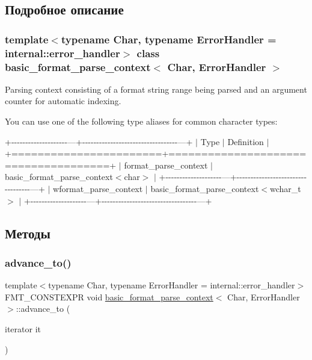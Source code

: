 \subsection{Подробное описание}
\subsubsection*{template$<$typename Char, typename Error\+Handler = internal\+::error\+\_\+handler$>$\newline
class basic\+\_\+format\+\_\+parse\+\_\+context$<$ Char, Error\+Handler $>$}

Parsing context consisting of a format string range being parsed and an argument counter for automatic indexing.

You can use one of the following type aliases for common character types\+:

+-\/-\/-\/-\/-\/-\/-\/-\/-\/-\/-\/-\/-\/-\/-\/-\/-\/-\/-\/-\/---+-\/-\/-\/-\/-\/-\/-\/-\/-\/-\/-\/-\/-\/-\/-\/-\/-\/-\/-\/-\/-\/-\/-\/-\/-\/-\/-\/-\/-\/-\/-\/-\/-\/-\/---+ $\vert$ Type $\vert$ Definition $\vert$ +=======================+=====================================+ $\vert$ format\+\_\+parse\+\_\+context $\vert$ basic\+\_\+format\+\_\+parse\+\_\+context$<$char$>$ $\vert$ +-\/-\/-\/-\/-\/-\/-\/-\/-\/-\/-\/-\/-\/-\/-\/-\/-\/-\/-\/-\/---+-\/-\/-\/-\/-\/-\/-\/-\/-\/-\/-\/-\/-\/-\/-\/-\/-\/-\/-\/-\/-\/-\/-\/-\/-\/-\/-\/-\/-\/-\/-\/-\/-\/-\/---+ $\vert$ wformat\+\_\+parse\+\_\+context $\vert$ basic\+\_\+format\+\_\+parse\+\_\+context$<$wchar\+\_\+t$>$ $\vert$ +-\/-\/-\/-\/-\/-\/-\/-\/-\/-\/-\/-\/-\/-\/-\/-\/-\/-\/-\/-\/---+-\/-\/-\/-\/-\/-\/-\/-\/-\/-\/-\/-\/-\/-\/-\/-\/-\/-\/-\/-\/-\/-\/-\/-\/-\/-\/-\/-\/-\/-\/-\/-\/-\/-\/---+  

\subsection{Методы}
\mbox{\label{classbasic__format__parse__context_ac123ab6c1c6e58db3ab0a917def4add8}} 
\subsubsection{\texorpdfstring{advance\+\_\+to()}{advance\_to()}}
{\footnotesize\ttfamily template$<$typename Char, typename Error\+Handler = internal\+::error\+\_\+handler$>$ \\
F\+M\+T\+\_\+\+C\+O\+N\+S\+T\+E\+X\+PR void \hyperlink{classbasic__format__parse__context}{basic\+\_\+format\+\_\+parse\+\_\+context}$<$ Char, Error\+Handler $>$\+::advance\+\_\+to (\begin{DoxyParamCaption}\item[{iterator}]{it }\end{DoxyParamCaption})\hspace{0.3cm}{\ttfamily [inline]}}

